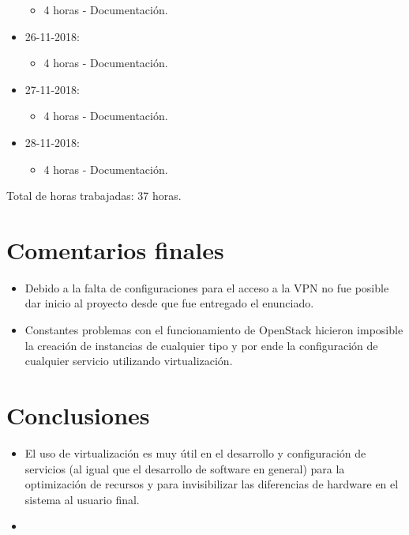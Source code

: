 \documentclass{article}
\begin{document}
\begin{itemize}
  \begin{itemize}
    \item 4 horas - Documentaci\'on.
  \end{itemize}
  \item 26-11-2018:
  \begin{itemize}
    \item 4 horas - Documentaci\'on.
  \end{itemize}
  \item 27-11-2018:
  \begin{itemize}
    \item 4 horas - Documentaci\'on.
  \end{itemize}
  \item 28-11-2018:
  \begin{itemize}
    \item 4 horas - Documentaci\'on.
  \end{itemize}
\end{itemize}
Total de horas trabajadas: 37 horas.

\section{Comentarios finales}
\begin{itemize}
  \item Debido a la falta de configuraciones para el acceso a la VPN no fue posible dar inicio al proyecto desde que fue entregado el enunciado.
  \item Constantes problemas con el funcionamiento de OpenStack hicieron imposible la creaci\'on de instancias de cualquier tipo y por ende la configuraci\'on de cualquier servicio utilizando virtualizaci\'on.
\end{itemize}

\section{Conclusiones}
\begin{itemize}
  \item El uso de virtualizaci\'on es muy \'util en el desarrollo y configuraci\'on de servicios (al igual que el desarrollo de software en general) para la optimizaci\'on de recursos y para invisibilizar las diferencias de hardware en el sistema al usuario final.
  \item 
\end{itemize}
\end{document}
